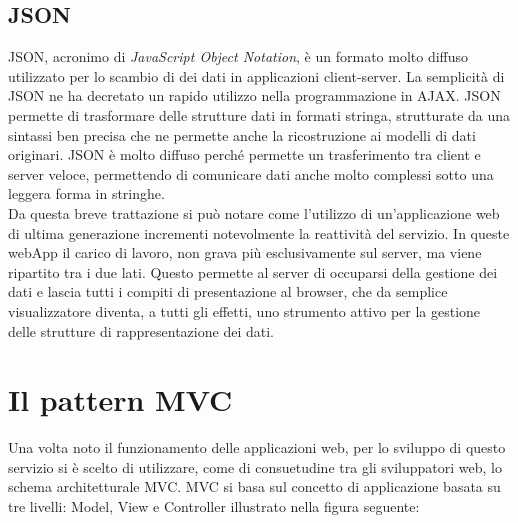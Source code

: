 \subsection{JSON} %
\label{sub:json}
JSON, acronimo di {\itshape JavaScript Object Notation}, è un formato molto diffuso utilizzato per lo scambio di dei dati in applicazioni client-server. La semplicità di JSON ne ha decretato un rapido utilizzo nella programmazione in AJAX. JSON permette di trasformare delle strutture dati in formati stringa, strutturate da una sintassi ben precisa che ne permette anche la ricostruzione ai modelli di dati originari. JSON è molto diffuso perché permette un trasferimento tra client e server veloce, permettendo di comunicare dati anche molto complessi sotto una leggera forma in stringhe.\\

Da questa breve trattazione si può notare come l’utilizzo di un’applicazione web di ultima generazione incrementi notevolmente la reattività del servizio. In queste webApp il carico di lavoro, non grava più esclusivamente sul server, ma viene ripartito tra i due lati. Questo permette al server di occuparsi della gestione dei dati e lascia tutti i compiti di presentazione al browser, che da semplice visualizzatore diventa, a tutti gli effetti, uno strumento attivo per la gestione delle strutture di rappresentazione dei dati.

\newpage

\section{Il pattern MVC} %
\label{sec:il_pattern_mvc}

Una volta noto il funzionamento delle applicazioni web, per lo sviluppo di questo servizio si è scelto di utilizzare, come di consuetudine tra gli sviluppatori web, lo schema architetturale MVC.
MVC si basa sul concetto di applicazione basata su tre livelli: Model, View e Controller illustrato nella figura seguente:

